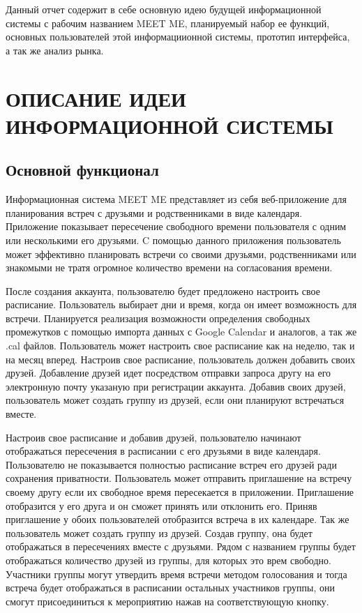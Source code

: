 \documentclass[14pt]{extreport}
\begin{document}
\pagestyle{empty} %



\pagestyle{plain} %
\tableofcontents
\intro\label{intro}

Данный отчет содержит в себе основную идею будущей информационной системы с рабочим названием MEET ME, планируемый набор ее функций, основных пользователей этой информациионной системы, прототип интерфейса, а так же анализ рынка.

\chapter{ОПИСАНИЕ ИДЕИ ИНФОРМАЦИОННОЙ СИСТЕМЫ \label{chapter1}}

\section{Основной функционал }

Информационная система MEET ME представляет из себя веб-приложение для планирования встреч с друзьями и родственниками в виде календаря. 
Приложение показывает пересечение свободного времени пользователя с одним или несколькими его друзьями.
C помощью данного приложения пользователь может эффективно планировать встречи со своими друзьями, родственниками или знакомыми не тратя огромное количество времени на согласования времени. 

После создания аккаунта, пользователю будет предложено настроить свое расписание. Пользователь выбирает дни и время, когда он имеет возможность для встречи. Планируется реализация возможности определения свободных промежутков с помощью импорта данных с Google Calendar и аналогов, а так же .cal файлов.
Пользователь может настроить свое расписание как на неделю, так и на месяц вперед. Настроив свое расписание, пользователь должен добавить своих друзей.  Добавление друзей идет посредством отправки запроса другу на его электронную почту указаную при регистрации аккаунта. Добавив своих друзей, пользователь может создать группу из друзей, если они планируют встречаться вместе.

Настроив свое расписание и добавив друзей, пользователю начинают отображаться пересечения в расписании с его друзьями в виде календаря. Пользователю не показывается полностью расписание встреч его друзей ради сохранения приватности. Пользователь может отправить приглашение на встречу своему другу если их свободное время пересекается в приложении. Приглашение отобразится у его друга и он сможет принять или отклонить его. Приняв приглашение у обоих пользователей отобразится встреча в их календаре. Так же пользователь может создать группу из друзей. Создав группу, она будет отображаться в пересечениях вместе с друзьями. Рядом с названием группы будет отображаться количество друзей из группы, для которых это врем свободно. Участники группы могут утвердить время встречи методом голосования и тогда встреча будет отображаться в расписании остальных участников группы, они смогут присоединиться к мероприятию нажав на соответствующую кнопку.
\end{document}
